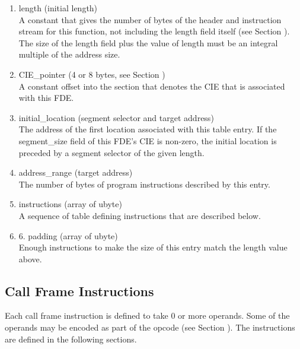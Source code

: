 \begin{enumerate}[1.]
\item length (initial length)  \\

A constant that gives the number of bytes of the header and
instruction stream for this function, not including the length
field itself 
(see Section  ). 
The size of the length field
plus the value of length must be an integral multiple of the
address size.

\item   CIE\_pointer (4 or 8 bytes, see Section ) \\
A constant offset into the 
section that denotes
the CIE that is associated with this FDE.

\item  initial\_location (segment selector and target address) \\
The address of the first location associated with this table
entry. If the segment\_size field of this FDE's CIE is non-zero,
the initial location is preceded by a segment selector of
the given length.

\item  address\_range (target address) \\
The number of bytes of program instructions described by this entry.

\item instructions (array of ubyte) \\
A sequence of table defining instructions that are described below.

\item 6. padding (array of ubyte) \\
Enough  instructions to make the size of this
entry match the length value above.
\end{enumerate}

\subsection{Call Frame Instructions}
\label{chap:callframeinstructions}

Each call frame instruction is defined to take 0 or more
operands. Some of the operands may be encoded as part of the
opcode 
(see Section ). 
The instructions are defined in
the following sections.

